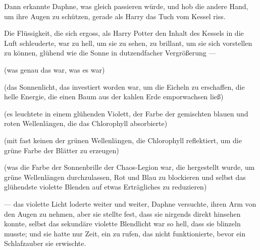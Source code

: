 Dann erkannte Daphne, was gleich passieren würde, und hob die andere Hand, um ihre Augen zu schützen, gerade als Harry das Tuch vom Kessel riss.

Die Flüssigkeit, die sich ergoss, als Harry Potter den Inhalt des Kessels in die Luft schleuderte, war zu hell, um sie zu sehen, zu brillant, um sie sich vorstellen zu können, glühend wie die Sonne in dutzendfacher Vergrößerung —

(was genau das war, was es war)

(das Sonnenlicht, das investiert worden war, um die Eicheln zu erschaffen, die helle Energie, die einen Baum aus der kahlen Erde emporwachsen ließ)

(es leuchtete in einem glühenden Violett, der Farbe der gemischten blauen und roten Wellenlängen, die das Chlorophyll absorbierte)

(mit fast keinen der grünen Wellenlängen, die Chlorophyll reflektiert, um die grüne Farbe der Blätter zu erzeugen)

(was die Farbe der Sonnenbrille der Chaos-Legion war, die hergestellt wurde, um grüne Wellenlängen durchzulassen, Rot und Blau zu blockieren und selbst das glühendste violette Blenden auf etwas Erträgliches zu reduzieren)

— das violette Licht loderte weiter und weiter, Daphne versuchte, ihren Arm von den Augen zu nehmen, aber sie stellte fest, dass sie nirgends direkt hinsehen konnte, selbst das sekundäre violette Blendlicht war so hell, dass sie blinzeln musste; und sie hatte nur Zeit, ein  zu rufen, das nicht funktionierte, bevor ein Schlafzauber sie erwischte.

